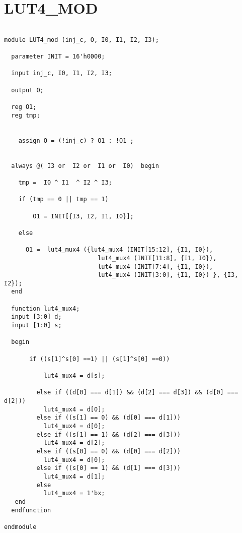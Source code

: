 \section{LUT4\_MOD}
\begin{lstlisting}

module LUT4_mod (inj_c, O, I0, I1, I2, I3);

  parameter INIT = 16'h0000;

  input inj_c, I0, I1, I2, I3;

  output O;

  reg O1;
  reg tmp;

  
    assign O = (!inj_c) ? O1 : !O1 ;
	
	
  always @( I3 or  I2 or  I1 or  I0)  begin
 
    tmp =  I0 ^ I1  ^ I2 ^ I3;

    if (tmp == 0 || tmp == 1)

        O1 = INIT[{I3, I2, I1, I0}];

    else 
    
      O1 =  lut4_mux4 ({lut4_mux4 (INIT[15:12], {I1, I0}),
                          lut4_mux4 (INIT[11:8], {I1, I0}),
                          lut4_mux4 (INIT[7:4], {I1, I0}),
                          lut4_mux4 (INIT[3:0], {I1, I0}) }, {I3, I2});
  end

  function lut4_mux4;
  input [3:0] d;
  input [1:0] s;
   
  begin

       if ((s[1]^s[0] ==1) || (s[1]^s[0] ==0))
           
           lut4_mux4 = d[s];

         else if ((d[0] === d[1]) && (d[2] === d[3]) && (d[0] === d[2])) 
           lut4_mux4 = d[0];
         else if ((s[1] == 0) && (d[0] === d[1]))
           lut4_mux4 = d[0];
         else if ((s[1] == 1) && (d[2] === d[3])) 
           lut4_mux4 = d[2];
         else if ((s[0] == 0) && (d[0] === d[2])) 
           lut4_mux4 = d[0];
         else if ((s[0] == 1) && (d[1] === d[3]))
           lut4_mux4 = d[1];
         else
           lut4_mux4 = 1'bx;
   end
  endfunction

endmodule


\end{lstlisting}

